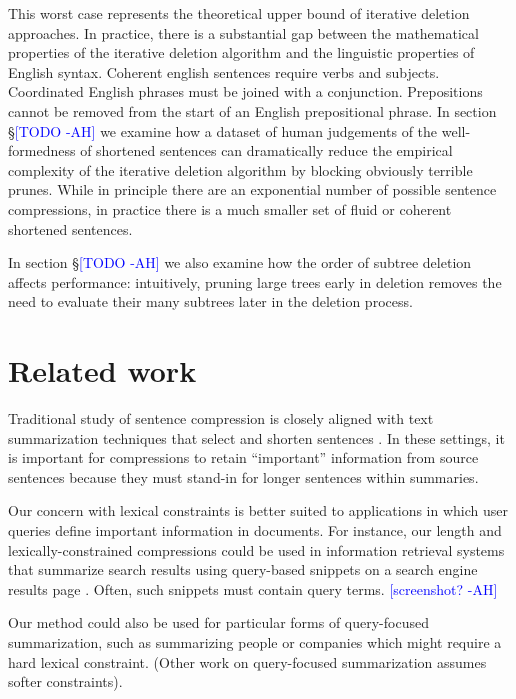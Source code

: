 \documentclass[11pt,a4paper]{article}
\newcommand{\ahcomment}[1]{\textcolor{blue}{[#1 -AH]}}
\begin{document}
This worst case represents the theoretical upper bound of iterative deletion approaches. In practice, there is a substantial gap between the mathematical properties of the iterative deletion algorithm and the linguistic properties of English syntax. Coherent english sentences require verbs and subjects. Coordinated English phrases must be joined with a conjunction. Prepositions cannot be removed from the start of an English prepositional phrase. In section \S\ahcomment{TODO} we examine how a dataset of human judgements of the well-formedness of shortened sentences can dramatically reduce the empirical complexity of the iterative deletion algorithm by blocking obviously terrible prunes. While in principle there are an exponential number of possible sentence compressions, in practice there is a much smaller set of fluid or coherent shortened sentences. 

In section \S\ahcomment{TODO} we also examine how the order of subtree deletion affects performance: intuitively, pruning large trees early in deletion removes the need to evaluate their many subtrees later in the deletion process.



\section{Related work}

Traditional study of sentence compression is closely aligned with text summarization techniques that select and  shorten sentences \cite{Knight2000StatisticsBasedS,vanderwende2007beyond,clarke2008global,Nenkova2012ASO}. 
In these settings, it is important for compressions to retain ``important'' information from source sentences because they must stand-in for longer sentences within summaries.

Our concern with lexical constraints is better suited to applications in which user queries define important information in documents. For instance, our length and lexically-constrained compressions could be used in information retrieval systems that summarize search results using query-based snippets on a search engine results page \cite{tombros1998advantages,Metzler2008MachineLS}. Often, such snippets must contain query terms. \ahcomment{screenshot?}

Our method could also be used for particular forms of query-focused summarization, such as summarizing people \cite{w04} or companies \cite{filippova2009company} which might require a hard lexical constraint. (Other work on query-focused summarization \cite{das} assumes softer constraints). 
\end{document}
